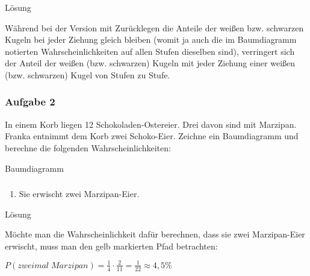 \documentclass[
  ngerman,
]{book}
\providecommand{\tightlist}{%
  \setlength{\itemsep}{0pt}\setlength{\parskip}{0pt}}
\begin{document}
Lösung

Während bei der Version mit Zurücklegen die Anteile der weißen bzw. schwarzen Kugeln bei jeder Ziehung gleich bleiben (womit ja auch die im Baumdiagramm notierten Wahrscheinlichkeiten auf allen Stufen dieselben sind), verringert sich der Anteil der weißen (bzw. schwarzen) Kugeln mit jeder Ziehung einer weißen (bzw. schwarzen) Kugel von Stufen zu Stufe.

\hypertarget{section-136}{%
\subsubsection*{}\label{section-136}}

\hypertarget{aufgabe-2-14}{%
\subsubsection*{Aufgabe 2}\label{aufgabe-2-14}}

In einem Korb liegen 12 Schokoladen-Ostereier. Drei davon sind mit Marzipan. Franka entnimmt dem Korb zwei Schoko-Eier. Zeichne ein Baumdiagramm und berechne die folgenden Wahrscheinlichkeiten:

Baumdiagramm

\hypertarget{section-137}{%
\subsubsection*{}\label{section-137}}

\begin{enumerate}
\def\labelenumi{\alph{enumi})}
\tightlist
\item
  Sie erwischt zwei Marzipan-Eier.
\end{enumerate}

Lösung

Möchte man die Wahrscheinlichkeit dafür berechnen, dass sie zwei Marzipan-Eier erwischt, muss man den gelb markierten Pfad betrachten:

\(P(zweimal\;Marzipan)= \frac{1}{4} \cdot \frac{2}{11} = \frac{1}{22} \approx 4,5\%\)

\hypertarget{section-138}{%
\subsubsection*{}\label{section-138}}
\end{document}
